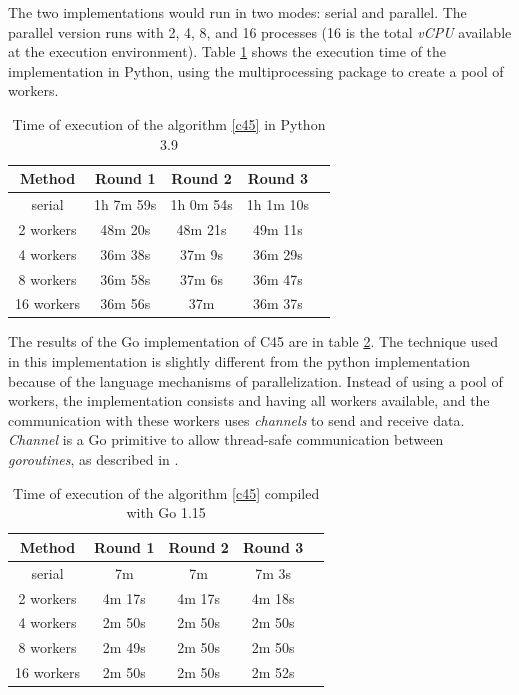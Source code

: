 \documentclass[conference]{IEEEtran}
\begin{document}
The two implementations would run in two modes: serial and parallel. The parallel version runs with 2, 4, 8, and 16 processes (16 is the total \textit{vCPU} available at the execution environment). Table \ref{table:execution_time_python} shows the execution time of the implementation in Python, using the multiprocessing package to create a pool of workers.

\begin{table}[!ht]
\centering
\begin{tabular}{ |c|c|c|c|c| }
\hline
Method &Round 1 &Round 2 &Round 3 \\
\hline
serial &1h 7m 59s &1h 0m 54s &1h 1m 10s \\
2 workers &48m 20s &48m 21s &49m 11s \\
4 workers &36m 38s &37m 9s &36m 29s \\
8 workers &36m 58s &37m 6s &36m 47s \\
16 workers &36m 56s	&37m &36m 37s \\
\hline
\end{tabular}
\caption{Time of execution of the algorithm \ref{c45} in Python 3.9}
\label{table:execution_time_python}
\end{table}

The results of the Go implementation of C45 are in table \ref{table:execution_time_go}. The technique used in this implementation is slightly different from the python implementation because of the language mechanisms of parallelization. Instead of using a pool of workers, the implementation consists and having all workers available, and the communication with these workers uses \textit{channels} to send and receive data. \textit{Channel} is a Go primitive to allow thread-safe communication between \textit{goroutines}, as described in \cite{go-channel}.

\begin{table}[!ht]
\centering
\begin{tabular}{ |c|c|c|c|c| }
\hline
Method &Round 1 &Round 2 &Round 3 \\
\hline
serial &7m &7m &7m 3s \\
2 workers &4m 17s &4m 17s &4m 18s \\
4 workers &2m 50s &2m 50s &2m 50s \\
8 workers &2m 49s &2m 50s &2m 50s \\
16 workers &2m 50s &2m 50s &2m 52s \\
\hline
\end{tabular}
\caption{Time of execution of the algorithm \ref{c45} compiled with Go 1.15}
\label{table:execution_time_go}
\end{table}
\end{document}
